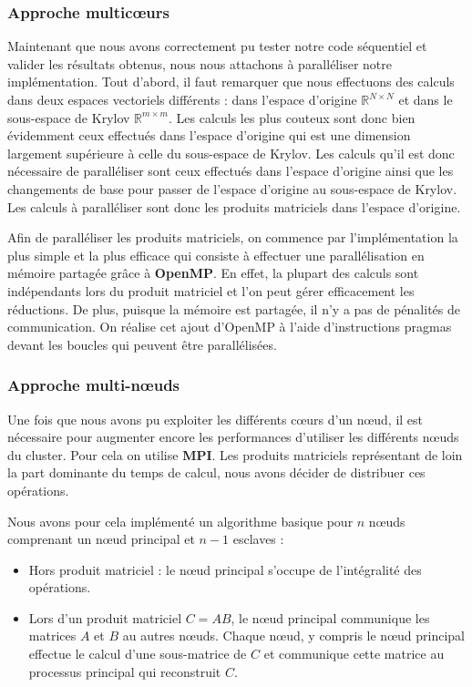 \documentclass[11pt,a4paper]{article}
\begin{document}
	\subsubsection{Approche multic\oe{}urs}

		Maintenant que nous avons correctement pu tester notre code séquentiel et valider les résultats obtenus, nous nous attachons à paralléliser notre implémentation. Tout d'abord, il faut remarquer que nous effectuons des calculs dans deux espaces vectoriels différents : dans l'espace d'origine $\mathbb{R}^{N\times N}$ et dans le sous-espace de Krylov $\mathbb{R}^{m\times m}$. Les calculs les plus couteux sont donc bien évidemment ceux effectués dans l'espace d'origine qui est une dimension largement supérieure à celle du sous-espace de Krylov. Les calculs qu'il est donc nécessaire de paralléliser sont ceux effectués dans l'espace d'origine ainsi que les changements de base pour passer de l'espace d'origine au sous-espace de Krylov. Les calculs à paralléliser sont donc les produits matriciels dans l'espace d'origine.

		Afin de paralléliser les produits matriciels, on commence par l'implémentation la plus simple et la plus efficace qui consiste à effectuer une parallélisation en mémoire partagée grâce à \textbf{OpenMP}. En effet, la plupart des calculs sont indépendants lors du produit matriciel et l'on peut gérer efficacement les réductions. De plus, puisque la mémoire est partagée, il n'y a pas de pénalités de communication. On réalise cet ajout d'OpenMP à l'aide d'instructions pragmas devant les boucles qui peuvent être parallélisées.
		
		\subsubsection{Approche multi-n\oe{}uds}

		Une fois que nous avons pu exploiter les différents c\oe{}urs d'un n\oe{}ud, il est nécessaire pour augmenter encore les performances d'utiliser les différents n\oe{}uds du cluster. Pour cela on utilise \textbf{MPI}. Les produits matriciels représentant de loin la part dominante du temps de calcul, nous avons décider de distribuer ces opérations.

		Nous avons pour cela implémenté un algorithme basique pour $n$ nœuds comprenant un n\oe{}ud principal et $n-1$ esclaves :

		\begin{itemize}
			\item Hors produit matriciel : le n\oe{}ud principal s'occupe de l'intégralité des opérations.
			\item Lors d'un produit matriciel $C = AB$, le n\oe{}ud principal communique les matrices $A$ et $B$ au autres n\oe{}uds. Chaque n\oe{}ud, y compris le n\oe{}ud principal effectue le calcul d'une sous-matrice de $C$ et communique cette matrice au processus principal qui reconstruit $C$.
		\end{itemize}
\end{document}
